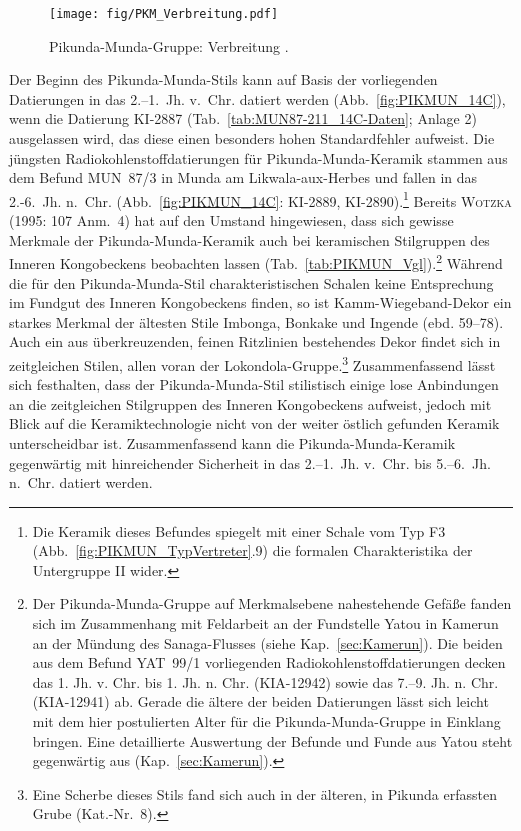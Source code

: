 \begin{figure}[p]
	\centering
	\texttt{[image: fig/PKM\_Verbreitung.pdf]}
	\caption{Pikunda-Munda-Gruppe: Verbreitung \parencites[grau nach][119 Anm.~4, 531 Taf.~97.5]{Wotzka.1995}[114 Abb.~42]{Gillet.2013}.}
	\label{fig:PIKMUN_Verbreitung}
\end{figure}

Der Beginn des Pikunda-Munda-Stils kann auf Basis der vorliegenden Datierungen in das 2.--1.~Jh. v.~Chr. datiert werden (Abb.~\ref{fig:PIKMUN_14C}), wenn die Datierung KI-2887 (Tab.~\ref{tab:MUN87-211_14C-Daten}; Anlage 2) ausgelassen wird, das diese einen besonders hohen Standardfehler aufweist. Die jüngsten Radiokohlenstoffdatierungen für Pikunda-Munda-Keramik stammen aus dem Befund MUN~87/3 in Munda am \mbox{Likwala}-\mbox{aux}-\mbox{Herbes} und fallen in das 2.-6.~Jh. n.~Chr. (Abb.~\ref{fig:PIKMUN_14C}: KI-2889, KI-2890).\footnote{Die Keramik dieses Befundes spiegelt mit einer Schale vom Typ F3 (Abb.~\ref{fig:PIKMUN_TypVertreter}.9) die formalen Charakteristika der Untergruppe II wider.} Bereits \textsc{Wotzka} (1995: 107 Anm.~4) hat auf den Umstand hingewiesen, dass sich gewisse Merkmale der Pikunda-Munda-Keramik auch bei keramischen Stilgruppen des Inneren Kongobeckens beobachten lassen (Tab.~\ref{tab:PIKMUN_Vgl}).\footnote{Der Pikunda-Munda-Gruppe auf Merkmalsebene nahestehende Gefäße fanden sich im Zusammenhang mit Feldarbeit an der Fundstelle Yatou in Kamerun an der Mündung des Sanaga-Flusses (siehe Kap.~\ref{sec:Kamerun}). Die beiden aus dem Befund YAT~99/1 vorliegenden Radiokohlenstoffdatierungen decken das 1. Jh. v. Chr. bis 1. Jh. n. Chr. (KIA-12942) sowie das 7.--9. Jh. n. Chr. (KIA-12941) ab. Gerade die ältere der beiden Datierungen lässt sich leicht mit dem hier postulierten Alter für die Pikunda-Munda-Gruppe in Einklang bringen. Eine detaillierte Auswertung der Befunde und Funde aus Yatou steht gegenwärtig aus (Kap.~\ref{sec:Kamerun}).} Während die für den Pikunda-Munda-Stil charakteristischen Schalen keine Entsprechung im Fundgut des Inneren Kongobeckens finden, so ist Kamm-Wiegeband-Dekor ein starkes Merkmal der ältesten Stile Imbonga, Bonkake und Ingende (ebd. 59--78). Auch ein aus überkreuzenden, feinen Ritzlinien bestehendes Dekor findet sich in zeitgleichen Stilen, allen voran der Lokondola-Gruppe.\footnote{Eine Scherbe dieses Stils fand sich auch in der älteren, in Pikunda erfassten Grube (Kat.-Nr.~8).} Zusammenfassend lässt sich festhalten, dass der Pikunda-Munda-Stil stilistisch einige lose Anbindungen an die zeitgleichen Stilgruppen des Inneren Kongobeckens aufweist, jedoch mit Blick auf die Keramiktechnologie nicht von der weiter östlich gefunden Keramik unterscheidbar ist. Zusammenfassend kann die Pikunda-Munda-Keramik gegenwärtig mit hinreichender Sicherheit in das 2.--1.~Jh. v.~Chr. bis 5.--6.~Jh. n.~Chr. datiert werden.

